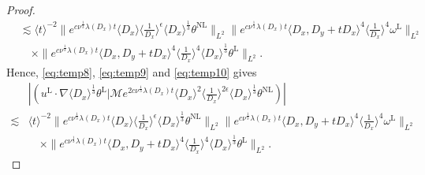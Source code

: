 \documentclass[reqno, 12pt]{amsart} %
\theoremstyle{plain} %
\theoremstyle{definition}
\theoremstyle{remark}
\numberwithin{equation}{section} %
\newcommand{\no}{\nonumber}
\begin{document}
\begin{proof}
\begin{align}
			&\no \lesssim\langle t\rangle^{-2} \|e^{c \nu^{\frac{1}{3}} \lambda\left(D_x\right) t}\langle D_x\rangle  \langle \frac{1}{D_x}\rangle^\epsilon \langle D_x \rangle^\frac13  \theta^{\mathrm{NL}}\|_{L^2}    \|e^{c \nu^{\frac{1}{3}} \lambda\left(D_x\right) t}\langle D_x, D_y + tD_x\rangle^4\langle\frac{1}{D_x}\rangle^4 \omega^{\mathrm{L}} \|_{L^2} \\
			&\quad \times \|e^{c \nu^{\frac{1}{3}} \lambda\left(D_x\right) t}\langle D_x, D_y + tD_x\rangle^4\langle\frac{1}{D_x}\rangle^4 \langle D_x \rangle^\frac13  \theta^{\mathrm{L}} \|_{L^2}.
		\end{align}
		Hence, \eqref{eq:temp8}, \eqref{eq:temp9} and \eqref{eq:temp10} gives
		\begin{equation}\begin{aligned} \label{eq:sum1}
				&\left|\left(u^{\mathrm{L}} \cdot \nabla \langle D_x \rangle^\frac13 \theta^{\mathrm{L}} \big| \mathcal{M} e^{2 c \nu^{\frac{1}{3}} \lambda\left(D_x\right) t}\langle D_x\rangle^2\langle\frac{1}{D_x}\rangle^{2 \epsilon} \langle D_x \rangle^\frac13 \theta^{\mathrm{NL}}\right)\right| \\
				\lesssim	& \langle t\rangle^{-2} \|e^{c \nu^{\frac{1}{3}} \lambda\left(D_x\right) t}\langle D_x\rangle  \langle \frac{1}{D_x}\rangle^\epsilon \langle D_x \rangle^\frac13  \theta^{\mathrm{NL}}\|_{L^2}    \|e^{c \nu^{\frac{1}{3}} \lambda\left(D_x\right) t}\langle D_x, D_y + tD_x\rangle^4\langle\frac{1}{D_x}\rangle^4 \omega^{\mathrm{L}} \|_{L^2} \\
				&\quad \times \|e^{c \nu^{\frac{1}{3}} \lambda\left(D_x\right) t}\langle D_x, D_y + tD_x\rangle^4\langle\frac{1}{D_x}\rangle^4 \langle D_x \rangle^\frac13  \theta^{\mathrm{L}} \|_{L^2}.
		\end{aligned}\end{equation}
		
		
		

\end{proof}
\end{document}
